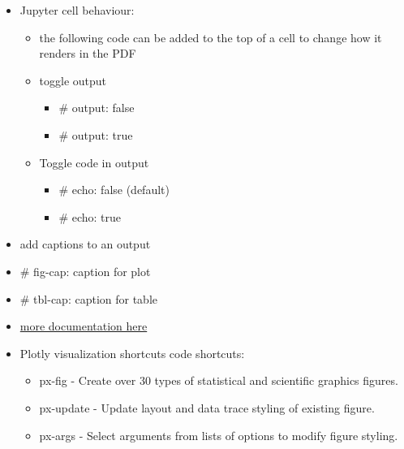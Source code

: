 \documentclass[
  letterpaper,
  DIV=11,
  numbers=noendperiod]{scrartcl}
\providecommand{\tightlist}{%
  \setlength{\itemsep}{0pt}\setlength{\parskip}{0pt}}\usepackage{longtable,booktabs,array}
\begin{document}
\begin{itemize}
\item
  Jupyter cell behaviour:

  \begin{itemize}
  \item
    the following code can be added to the top of a cell to change how
    it renders in the PDF
  \item
    toggle output

    \begin{itemize}
    \tightlist
    \item
      \#\textbar{} output: false
    \item
      \#\textbar{} output: true
    \end{itemize}
  \item
    Toggle code in output

    \begin{itemize}
    \tightlist
    \item
      \#\textbar{} echo: false (default)
    \item
      \#\textbar{} echo: true
    \end{itemize}
  \end{itemize}
\item
  add captions to an output
\item
  \#\textbar{} fig-cap: caption for plot
\item
  \#\textbar{} tbl-cap: caption for table
\item
  \href{https://quarto.org/docs/reference/cells/cells-jupyter.html}{more
  documentation here}
\item
  Plotly visualization shortcuts code shortcuts:

  \begin{itemize}
  \tightlist
  \item
    px-fig - Create over 30 types of statistical and scientific graphics
    figures.
  \item
    px-update - Update layout and data trace styling of existing figure.
  \item
    px-args - Select arguments from lists of options to modify figure
    styling.
  \end{itemize}
\end{itemize}
\end{document}

